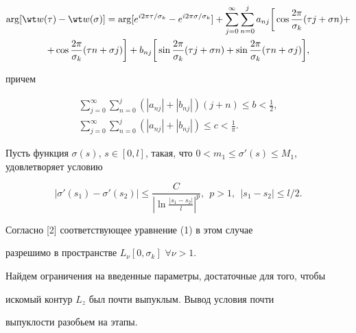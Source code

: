 \begin{multline}


\arg [\wt w(\tau) - \wt w(\sigma)] = \arg [e^{i 2 \pi \tau/ \sigma_k} -


e^{i 2\pi \sigma/\sigma_k}] + \sum_{j = 0}^{\infty} \sum_{n = 0}^j


a_{nj}\bigg[\cos\frac{2\pi}{\sigma_k} (\tau j + \sigma n) +\\


%


+ \cos\frac{2\pi}{\sigma_k} (\tau n + \sigma j)\bigg] +


b_{nj}\bigg[\sin\frac{2\pi}{\sigma_k} (\tau j + \sigma n) +


\sin\frac{2\pi}{\sigma_k} (\tau n + \sigma j)\bigg],


\end{multline}


причем


\begin{gather}


\sum_{j = 0}^{\infty} \sum_{n = 0}^j (|a_{nj}| + |b_{nj}|)(j + n)


\leq b < \frac{1}{2}, \\


%


\sum_{j = 0}^{\infty} \sum_{n = 0}^j (|a_{nj}| + |b_{nj}|)


\leq c < \frac{1}{\pi}.


\end{gather}


Пусть функция $\sigma(s)$, $s \in [0,l]$, такая, что $0 < m_1 \leq


\sigma'(s) \leq M_1$, удовлетворяет условию


\begin{equation}


|\sigma'(s_1) - \sigma'(s_2)| \leq \frac{C}{|\ln\frac{|s_1 -


s_2|}{l}|^p},\ \ p > 1,\ \ |s_1 - s_2| \leq l/2.


\end{equation}


Согласно [2] соответствующее уравнение (1) в этом случае


разрешимо в пространстве $L_{\nu}[0,\sigma_k]$ $\forall \nu > 1$.


Найдем ограничения на введенные параметры, достаточные для того, чтобы


искомый контур $L_z$ был почти выпуклым. Вывод условия почти


выпуклости разобьем на этапы.





